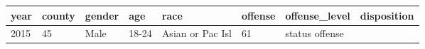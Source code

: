 \documentclass[]{article}
\begin{document}
\begin{longtable}[]{@{}llllllll@{}}
\toprule
\begin{minipage}[b]{0.06\columnwidth}\raggedright\strut
year\strut
\end{minipage} & \begin{minipage}[b]{0.07\columnwidth}\raggedright\strut
county\strut
\end{minipage} & \begin{minipage}[b]{0.07\columnwidth}\raggedright\strut
gender\strut
\end{minipage} & \begin{minipage}[b]{0.07\columnwidth}\raggedright\strut
age\strut
\end{minipage} & \begin{minipage}[b]{0.16\columnwidth}\raggedright\strut
race\strut
\end{minipage} & \begin{minipage}[b]{0.08\columnwidth}\raggedright\strut
offense\strut
\end{minipage} & \begin{minipage}[b]{0.14\columnwidth}\raggedright\strut
offense\_level\strut
\end{minipage} & \begin{minipage}[b]{0.14\columnwidth}\raggedright\strut
disposition\strut
\end{minipage}\tabularnewline
\midrule
\endhead
\begin{minipage}[t]{0.06\columnwidth}\raggedright\strut
2015\strut
\end{minipage} & \begin{minipage}[t]{0.07\columnwidth}\raggedright\strut
45\strut
\end{minipage} & \begin{minipage}[t]{0.07\columnwidth}\raggedright\strut
Male\strut
\end{minipage} & \begin{minipage}[t]{0.07\columnwidth}\raggedright\strut
18-24\strut
\end{minipage} & \begin{minipage}[t]{0.16\columnwidth}\raggedright\strut
Asian or Pac Isl\strut
\end{minipage} & \begin{minipage}[t]{0.08\columnwidth}\raggedright\strut
61\strut
\end{minipage} & \begin{minipage}[t]{0.14\columnwidth}\raggedright\strut
status offense\strut
\end{minipage} & \begin{minipage}[t]{0.14\columnwidth}\raggedright\strut

\end{minipage}
\end{longtable}
\end{document}
